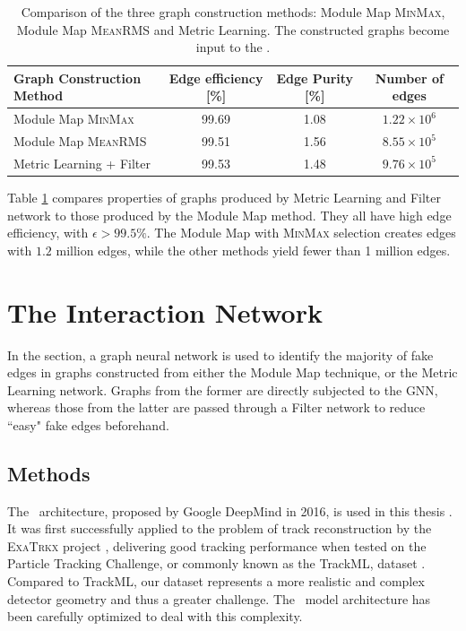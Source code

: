 \begin{table}[h!]
    \centering
    \begin{tabular}{l|c|c|c}
      Graph Construction Method  & Edge efficiency [\%] & Edge Purity [\%] & Number of edges  \\
      \hline \hline
        Module Map {\textsc{MinMax}} & 99.69 & 1.08 & $1.22\times 10^6$ \\
        Module Map {\textsc{MeanRMS}} & 99.51  & 1.56 & $8.55\times 10^5$ \\
        Metric Learning + Filter & 99.53  & 1.48 & $9.76\times 10^5$\\
        \hline
    \end{tabular}
    \caption{Comparison of the three graph construction methods: Module Map \textsc{MinMax}, Module Map \textsc{MeanRMS} and Metric Learning. 
    The constructed graphs become input to the \ignn.}
    \label{tab:graph-contruction-comparison}
\end{table}

Table \ref{tab:graph-contruction-comparison} compares properties of graphs produced by Metric Learning and Filter network to those produced by the Module Map method. 
They all have high edge efficiency, with $\epsilon> 99.5\%$. 
The Module Map with \textsc{MinMax} selection creates edges with $1.2$ million edges, while the other methods yield fewer than 1 million edges. 

\section{The Interaction Network}
\label{sect:ignn}

In the section, a graph neural network is used to identify the majority of fake edges in graphs constructed from either the Module Map technique, or the Metric Learning network.
Graphs from the former are directly subjected to the GNN, whereas those from the latter are passed through a Filter network to reduce ``easy" fake edges beforehand.

\subsection{Methods}

The \ignn~architecture, proposed by Google DeepMind in 2016, 
is used in this thesis \cite{interaction-gnn}. 
It was first successfully applied to the problem of track reconstruction by the \textsc{ExaTrkx} project \cite{exatrkx}, delivering good tracking performance when tested on the Particle Tracking Challenge, or commonly known as the TrackML, dataset \cite{trackml-particle-identification}.
Compared to TrackML, our dataset represents a more realistic and complex detector geometry and thus a greater challenge. 
The \ignn~model architecture has been carefully optimized to deal with this complexity. 

